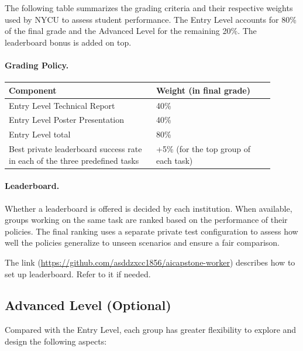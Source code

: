 \documentclass[11pt]{article}
\begin{document}
\begin{tutornote}
\label{ttn:entry-grading}
    The following table summarizes the grading criteria and their respective weights used by NYCU to assess student performance.
    The Entry Level accounts for 80\% of the final grade and the Advanced Level for the remaining 20\%. The leaderboard
    bonus is added on top.
    \paragraph{Grading Policy.}
    \begin{longtable}{L{0.5\linewidth}L{0.4\linewidth}}
    \toprule
    \textbf{Component} & \textbf{Weight (in final grade)}\\
    \midrule
    Entry Level Technical Report & 40\% \\
    Entry Level Poster Presentation & 40\% \\
    \midrule
    Entry Level total & 80\% \\
    \midrule
    Best private leaderboard success rate in each of the three predefined tasks & +5\% (for the top group of each task) \\
    \bottomrule
    \end{longtable}
\end{tutornote}


\paragraph{Leaderboard.}
\label{sec:leaderboard}

Whether a leaderboard is offered is decided by each institution. When available, groups working on the same task are ranked based on the performance of their policies. The final ranking uses a separate private test configuration to assess how well the policies generalize to unseen scenarios and ensure a fair comparison.

\begin{tutornote}
The link (\url{https://github.com/asddzxcc1856/aicapstone-worker}) describes how to set up leaderboard. Refer to it if needed.
\end{tutornote}


\subsection{Advanced Level (Optional)} 

Compared with the Entry Level, each group has greater flexibility to explore and design the following aspects:
\end{document}
